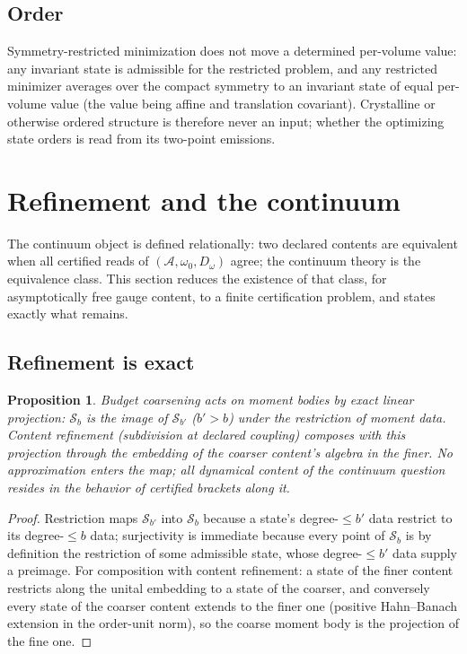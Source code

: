 \documentclass[11pt]{article}
\newtheorem{proposition}[theorem]{Proposition}
\theoremstyle{definition}
\theoremstyle{remark}
\newcommand{\A}{\mathcal{A}}
\newcommand{\w}{\omega_0}
\begin{document}
\subsection{Order}\label{sec:order}
Symmetry-restricted minimization does not move a determined per-volume
value: any invariant state is admissible for the restricted problem, and
any restricted minimizer averages over the compact symmetry to an
invariant state of equal per-volume value (the value being affine and
translation covariant).  Crystalline or otherwise ordered structure is
therefore never an input; whether the optimizing state orders is read
from its two-point emissions.

\section{Refinement and the continuum}\label{sec:continuum}

The continuum object is defined relationally: two declared contents are
equivalent when all certified reads of $(\A, \w, D_\omega)$ agree; the
continuum theory is the equivalence class.  This section reduces the
existence of that class, for asymptotically free gauge content, to a
finite certification problem, and states exactly what remains.

\subsection{Refinement is exact}
\begin{proposition}\label{prop:projection}
Budget coarsening acts on moment \emph{bodies} by exact linear
projection: $\mathcal S_b$ is the image of $\mathcal S_{b'}$
($b' > b$) under the restriction of moment data.  Content refinement
(subdivision at declared coupling) composes with this projection
through the embedding of the coarser content's algebra in the finer.
No approximation enters the map; all dynamical content of the
continuum question resides in the behavior of certified brackets along
it.
\end{proposition}
\begin{proof}
Restriction maps $\mathcal S_{b'}$ into $\mathcal S_b$ because a
state's degree-$\le b'$ data restrict to its degree-$\le b$ data;
surjectivity is immediate because every point of $\mathcal S_b$ is by
definition the restriction of some admissible state, whose
degree-$\le b'$ data supply a preimage.  For composition with content
refinement: a state of the finer content restricts along the unital
embedding to a state of the coarser, and conversely every state of the
coarser content extends to the finer one (positive Hahn--Banach
extension in the order-unit norm), so the coarse moment body is the
projection of the fine one.
\end{proof}
\end{document}
